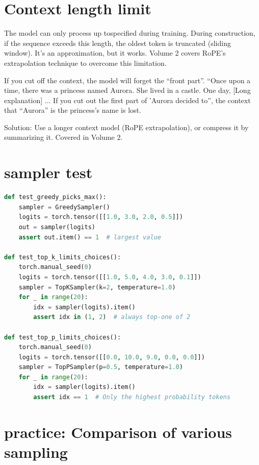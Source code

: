 \section{Context length limit}

The model can only process up tospecified during training. During construction, if the sequence exceeds this length, the oldest token is truncated (sliding window). It's an approximation, but it works. Volume 2 covers RoPE's extrapolation technique to overcome this limitation.

\begin{warnbox}
If you cut off the context, the model will forget the ``front part''. ``Once upon a time, there was a princess named Aurora. She lived in a castle. One day, [Long explanation] ... If you cut out the first part of 'Aurora decided to'', the context that ``Aurora'' is the princess's name is lost.

Solution: Use a longer context model (RoPE extrapolation), or compress it by summarizing it. Covered in Volume 2.
\end{warnbox}

\section{sampler test}

\begin{lstlisting}[language=Python]
def test_greedy_picks_max():
    sampler = GreedySampler()
    logits = torch.tensor([[1.0, 3.0, 2.0, 0.5]])
    out = sampler(logits)
    assert out.item() == 1  # largest value

def test_top_k_limits_choices():
    torch.manual_seed(0)
    logits = torch.tensor([[1.0, 5.0, 4.0, 3.0, 0.1]])
    sampler = TopKSampler(k=2, temperature=1.0)
    for _ in range(20):
        idx = sampler(logits).item()
        assert idx in (1, 2)  # always top-one of 2

def test_top_p_limits_choices():
    torch.manual_seed(0)
    logits = torch.tensor([[0.0, 10.0, 9.0, 0.0, 0.0]])
    sampler = TopPSampler(p=0.5, temperature=1.0)
    for _ in range(20):
        idx = sampler(logits).item()
        assert idx == 1  # Only the highest probability tokens
\end{lstlisting}

\section{practice: Comparison of various sampling}

